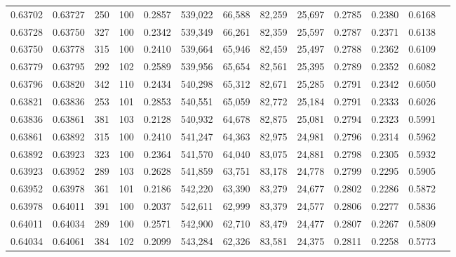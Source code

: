\begin{tabular}{rrrrrrrrrrrrr}
0.63702 & 0.63727 &   250 & 100 &                                     0.2857 & 539,022 &  66,588 &  82,259 &  25,697 & 0.2785 & 0.2380 & 0.6168 \\
0.63728 & 0.63750 &   327 & 100 &                                     0.2342 & 539,349 &  66,261 &  82,359 &  25,597 & 0.2787 & 0.2371 & 0.6138 \\
0.63750 & 0.63778 &   315 & 100 &                                     0.2410 & 539,664 &  65,946 &  82,459 &  25,497 & 0.2788 & 0.2362 & 0.6109 \\
0.63779 & 0.63795 &   292 & 102 &                                     0.2589 & 539,956 &  65,654 &  82,561 &  25,395 & 0.2789 & 0.2352 & 0.6082 \\
0.63796 & 0.63820 &   342 & 110 &                                     0.2434 & 540,298 &  65,312 &  82,671 &  25,285 & 0.2791 & 0.2342 & 0.6050 \\
0.63821 & 0.63836 &   253 & 101 &                                     0.2853 & 540,551 &  65,059 &  82,772 &  25,184 & 0.2791 & 0.2333 & 0.6026 \\
0.63836 & 0.63861 &   381 & 103 &                                     0.2128 & 540,932 &  64,678 &  82,875 &  25,081 & 0.2794 & 0.2323 & 0.5991 \\
0.63861 & 0.63892 &   315 & 100 &                                     0.2410 & 541,247 &  64,363 &  82,975 &  24,981 & 0.2796 & 0.2314 & 0.5962 \\
0.63892 & 0.63923 &   323 & 100 &                                     0.2364 & 541,570 &  64,040 &  83,075 &  24,881 & 0.2798 & 0.2305 & 0.5932 \\
0.63923 & 0.63952 &   289 & 103 &                                     0.2628 & 541,859 &  63,751 &  83,178 &  24,778 & 0.2799 & 0.2295 & 0.5905 \\
0.63952 & 0.63978 &   361 & 101 &                                     0.2186 & 542,220 &  63,390 &  83,279 &  24,677 & 0.2802 & 0.2286 & 0.5872 \\
0.63978 & 0.64011 &   391 & 100 &                                     0.2037 & 542,611 &  62,999 &  83,379 &  24,577 & 0.2806 & 0.2277 & 0.5836 \\
0.64011 & 0.64034 &   289 & 100 &                                     0.2571 & 542,900 &  62,710 &  83,479 &  24,477 & 0.2807 & 0.2267 & 0.5809 \\
0.64034 & 0.64061 &   384 & 102 &                                     0.2099 & 543,284 &  62,326 &  83,581 &  24,375 & 0.2811 & 0.2258 & 0.5773 \\

\end{tabular}
